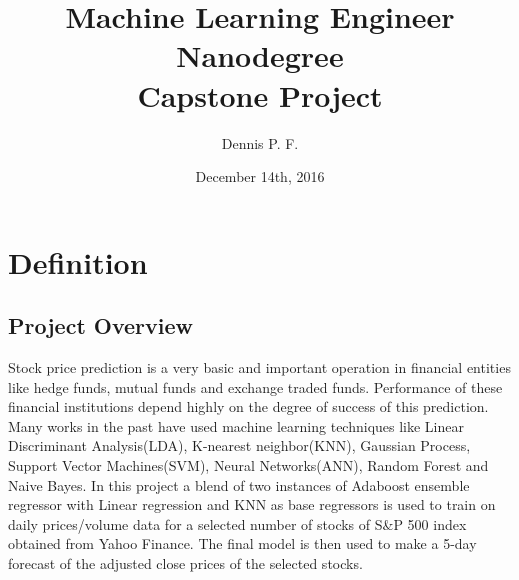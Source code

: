 \documentclass[10pt]{report}
\begin{document}
\title{%
  Machine Learning Engineer Nanodegree \\
  \large Capstone Project}
\author{Dennis P. F.}
\date{December 14th, 2016}
\maketitle

\section{Definition}
\subsection*{Project Overview}
Stock price prediction is a very basic and important operation in financial entities like hedge funds, mutual funds and exchange traded funds. Performance of these financial institutions depend highly on the degree of success of this prediction. Many works in the past have used machine learning techniques like Linear Discriminant Analysis(LDA), K-nearest neighbor(KNN), Gaussian Process, Support Vector Machines(SVM), Neural Networks(ANN), Random Forest and Naive Bayes\cite{Ou2009}\cite{Patel2015}. In this project a blend of two instances of Adaboost ensemble regressor with Linear regression and KNN as base regressors is used to train on daily prices/volume data for a selected number of stocks of S\&P 500\cite{sp500} index obtained from Yahoo Finance. The final model is then used to make a 5-day forecast of the adjusted close prices\cite{adjclose} of the selected stocks.
\end{document}
